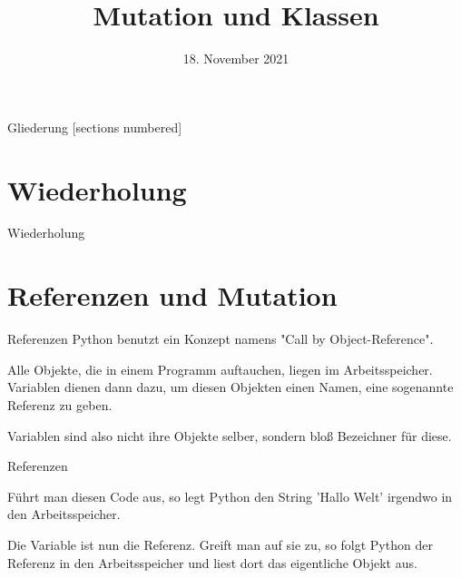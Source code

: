 



\title{Mutation und Klassen}
\date{18. November 2021}


	
\maketitle

\begin{frame}{Gliederung}
	[sections numbered]
	\tableofcontents
\end{frame}

\section{Wiederholung}
\begin{frame}{Wiederholung}
	
\end{frame}


\section{Referenzen und Mutation}
\begin{frame}{Referenzen}
	Python benutzt ein Konzept namens \alert{"Call by Object-Reference"}. 
	
	Alle Objekte, die in einem Programm auftauchen, liegen im Arbeitsspeicher. Variablen dienen dann dazu, um diesen Objekten einen Namen, eine sogenannte \alert{Referenz} zu geben. 
	
	Variablen sind also nicht ihre Objekte selber, sondern bloß Bezeichner für diese.
\end{frame}

\begin{frame}{Referenzen}
	
	Führt man diesen Code aus, so legt Python den String 'Hallo Welt' irgendwo in den Arbeitsspeicher. 
	
	Die Variable  ist nun die Referenz. Greift man auf sie zu, so folgt Python der Referenz in den Arbeitsspeicher und liest dort das eigentliche Objekt aus.
\end{frame}

